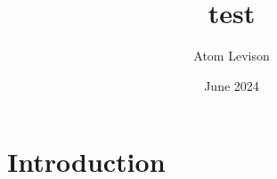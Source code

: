 \documentclass{article}
\title{test}
\author{Atom Levison}
\date{June 2024}
\begin{document}
\maketitle

\section{Introduction}
\end{document}
